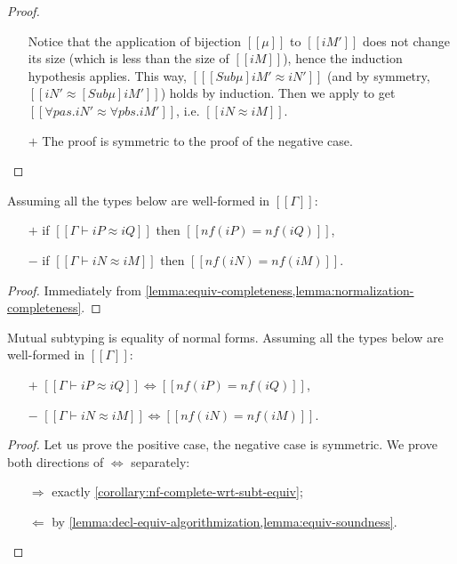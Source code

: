 \begin{proof}
\begin{itemize}
\begin{caseof}
  \label{lemma:poly-types-equivalence}
      Notice that the application of bijection $[[μ]]$ to $[[iM']]$ does
      not change its size (which is less than the size of $[[iM]]$), hence the induction hypothesis applies.
      This way, $[[ [Sub μ]iM' ≈ iN']]$ (and by symmetry, $[[iN' ≈ [Sub μ]iM']]$) holds by induction. 
      Then we apply  to get $[[∀pas.iN' ≈ ∀pbs.iM']]$, i.e. $[[iN ≈ iM]]$.
    \end{caseof}
      
\item[$+$] The proof is symmetric to the proof of the negative case.
  \end{itemize}
\end{proof}

\begin{corollary}
  \label{corollary:nf-complete-wrt-subt-equiv}
  Assuming all the types below are well-formed in $[[Γ]]$:
  \begin{itemize}
    \item [$+$] if $[[Γ ⊢ iP ≈ iQ]]$ then $[[nf(iP) = nf(iQ)]]$,
    \item [$-$] if $[[Γ ⊢ iN ≈ iM]]$ then $[[nf(iN) = nf(iM)]]$.
  \end{itemize}
\end{corollary}  
\begin{proof}
  Immediately from \cref{lemma:equiv-completeness,lemma:normalization-completeness}.
\end{proof}

\begin{lemma}
  \label{lemma:subt-equiv-algorithmization}
  Mutual subtyping is equality of normal forms.
 Assuming all the types below are well-formed in $[[Γ]]$:
  \begin{itemize}
    \item [$+$] $[[Γ ⊢ iP ≈ iQ]] \iff [[nf(iP) = nf(iQ)]]$,
    \item [$-$] $[[Γ ⊢ iN ≈ iM]] \iff [[nf(iN) = nf(iM)]]$.
  \end{itemize}
\end{lemma}
\begin{proof}
  Let us prove the positive case, the negative case is symmetric.
  We prove both directions of $\iff$ separately:
  \begin{itemize}
    \item [$\Rightarrow$] exactly \cref{corollary:nf-complete-wrt-subt-equiv};
    \item [$\Leftarrow$] by \cref{lemma:decl-equiv-algorithmization,lemma:equiv-soundness}.
  \end{itemize}
\end{proof}

